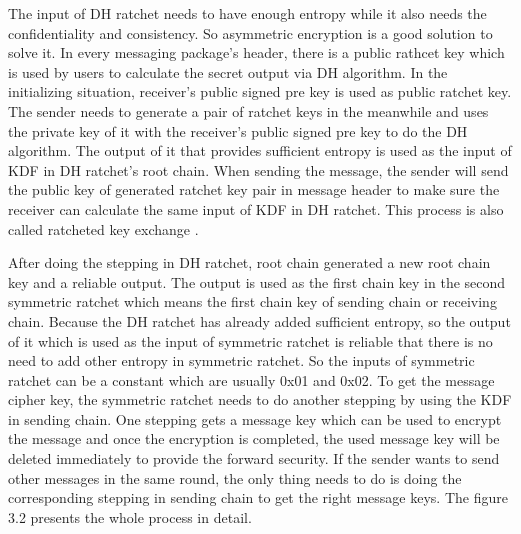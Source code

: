 \begin{enumerate}[label=(\roman*)]
The input of DH ratchet needs to have enough entropy while it also needs the confidentiality and consistency. So asymmetric encryption is a good solution to solve it. In every messaging package's header, there is a public rathcet key which is used by users to calculate the secret output via DH algorithm. In the initializing situation, receiver's public signed pre key is used as public ratchet key. The sender needs to generate a pair of ratchet keys in the meanwhile and uses the private key of it with the receiver's public signed pre key to do the DH algorithm. The output of it that provides sufficient entropy is used as the input of KDF in DH ratchet's root chain. When sending the message, the sender will send the public key of generated ratchet key pair in message header to make sure the receiver can calculate the same input of KDF in DH ratchet. This process is also called ratcheted key exchange \citep{RatchetedKeyExchange}.

After doing the stepping in DH ratchet, root chain generated a new root chain key and a reliable output. The output is used as the first chain key in the second symmetric ratchet which means the first chain key of sending chain or receiving chain. Because the DH ratchet has already added sufficient entropy, so the output of it which is used as the input of symmetric ratchet is reliable that there is no need to add other entropy in symmetric ratchet. So the inputs of symmetric ratchet can be a constant which are usually 0x01 and 0x02. To get the message cipher key, the symmetric ratchet needs to do another stepping by using the KDF in sending chain. One stepping gets a message key which can be used to encrypt the message and once the encryption is completed, the used message key will be deleted immediately to provide the forward security. If the sender wants to send other messages in the same round, the only thing needs to do is doing the corresponding stepping in sending chain to get the right message keys. The figure 3.2 presents the whole process in detail.


\end{enumerate}
